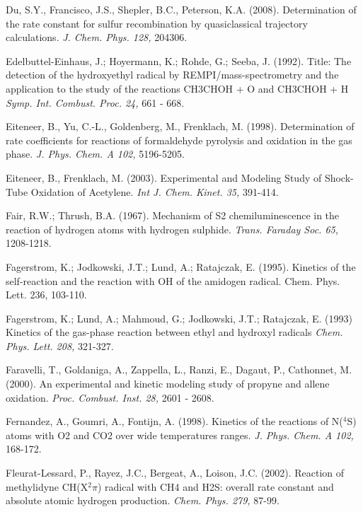 \documentclass[12pt,landscape]{article}
\newcounter{reaction}
\begin{document}
 Du, S.Y., Francisco, J.S., Shepler, B.C., Peterson, K.A. (2008). Determination of the rate constant for sulfur recombination by quasiclassical trajectory calculations. {\em J. Chem. Phys. 128,} 204306.
 
 Edelbuttel-Einhaus, J.; Hoyermann, K.; Rohde, G.; Seeba, J. (1992).
Title:   The detection of the hydroxyethyl radical by REMPI/mass-spectrometry and the application to the study of the reactions CH3CHOH + O and CH3CHOH + H
{\em Symp. Int. Combust. Proc.  24,}  661 - 668.

Eiteneer, B., Yu, C.-L., Goldenberg, M., Frenklach, M. (1998). Determination of rate coefficients for reactions of formaldehyde pyrolysis and oxidation in the gas phase. {\em J. Phys. Chem. A  102,} 5196-5205.

Eiteneer, B., Frenklach, M. (2003).  Experimental and Modeling Study of Shock-Tube Oxidation of Acetylene. {\em Int J. Chem. Kinet. 35,} 391-414.

Fair, R.W.; Thrush, B.A. (1967).  Mechanism of S2 chemiluminescence in the reaction of hydrogen atoms with hydrogen sulphide. { \em Trans. Faraday Soc. 65,} 1208-1218.

Fagerstrom, K.; Jodkowski, J.T.; Lund, A.; Ratajczak, E. (1995). Kinetics of the self-reaction and the reaction with OH of the amidogen radical. Chem. Phys. Lett. 236, 103-110.

Fagerstrom, K.; Lund, A.; Mahmoud, G.; Jodkowski, J.T.; Ratajczak, E. (1993)
Kinetics of the gas-phase reaction between ethyl and hydroxyl radicals	{\em Chem. Phys. Lett. 208,} 321-327.
	
Faravelli, T., Goldaniga, A., Zappella, L., Ranzi, E., Dagaut, P., Cathonnet, M. (2000). An experimental and kinetic modeling study of propyne and allene oxidation. {\em Proc. Combust. Inst. 28,} 2601 - 2608.

Fernandez, A., Goumri, A., Fontijn, A. (1998). Kinetics of the reactions of N($^4$S) atoms with O2 and CO2 over wide temperatures ranges. {\em J. Phys. Chem. A 102,} 168-172.

Fleurat-Lessard, P., Rayez, J.C., Bergeat, A., Loison, J.C. (2002). Reaction of methylidyne CH(X$^2\pi$) radical with CH4 and H2S: overall rate constant and absolute atomic hydrogen production. {\em Chem. Phys. 279,} 87-99. %
\end{document}
